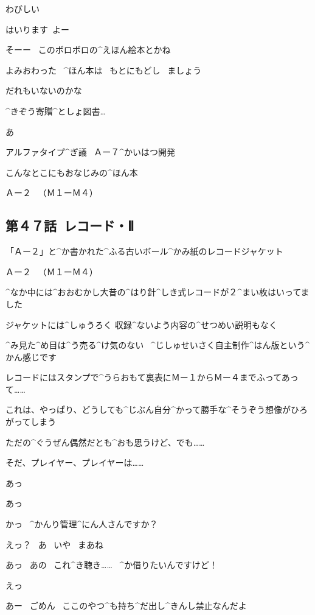 \page
\Kokone わびしい

\Kokone はいります\ よー

\Kokone そーー
\ このボロボロの^{えほん}{絵本}とかね

\Sign よみおわった
\ ^{ほん}{本}は
\ もとにもどし
\ ましょう

\page
\Kokone だれもいないのかな

\page
\Sign ^{きぞう}{寄贈}^{としょ}{図書}…

\Kokone あ

\Sign アルファタイプ^{ぎ}{議}
\ Ａー７^{かいはつ}{開発}

\Kokone こんなとこにもおなじみの^{ほん}{本}

\page
\Sign Ａー２
\ （Ｍ１ーＭ４）


\subsection{第４７話\ レコード・Ⅱ}

\page[53]
\Kokone 「Ａー２」と^{か}{書}かれた^{ふる}{古}いボール^{かみ}{紙}のレコードジャケット

\Sign Ａー２
\ （Ｍ１ーＭ４）

\Kokone ^{なか}{中}には^{おおむかし}{大昔}の^{はり}{針}^{しき}{式}レコードが２^{まい}{枚}はいってました

\page
\Kokone ジャケットには^{しゅうろく }{収録}^{ないよう}{内容}の^{せつめい}{説明}もなく

\Kokone ^{み}{見}た^{め}{目}は^{う}{売}る^{け}{気}のない
\ ^{じしゅせいさく}{自主制作}^{はん}{版}という^{かん}{感}じです

\Kokone レコードにはスタンプで^{うらおもて}{裏表}にＭー１からＭー４までふってあって……

\Kokone これは、やっぱり、どうしても^{じぶん}{自分}^{かって}{勝手}な^{そうぞう}{想像}がひろがってしまう

\page
\Kokone ただの^{ぐうぜん}{偶然}だとも^{おも}{思}うけど、でも……

\Kokone そだ、プレイヤー、プレイヤーは……

\page
\Kokone あっ

\Person あっ

\Kokone かっ
\ ^{かんり}{管理}^{にん}{人}さんですか？

\Person えっ？
\ あ
\ いや
\ まあね

\Kokone あっ
\ あの
\ これ^{き}{聴}き……
\ ^{か}{借}りたいんですけど！

\Person えっ

\Person あー
\ ごめん
\ ここのやつ^{も}{持}ち^{だ}{出}し^{きんし}{禁止}なんだよ


